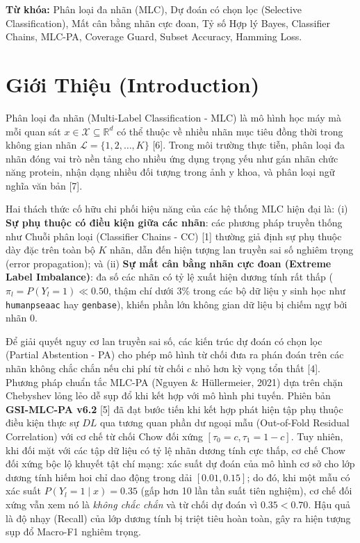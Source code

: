 \documentclass[10pt,a4paper,twoside]{article}
\begin{document}
\vspace{0.5em}
\noindent\textbf{Từ khóa:} Phân loại đa nhãn (MLC), Dự đoán có chọn lọc (Selective Classification), Mất cân bằng nhãn cực đoan, Tỷ số Hợp lý Bayes, Classifier Chains, MLC-PA, Coverage Guard, Subset Accuracy, Hamming Loss.

\section{Giới Thiệu (Introduction)}
Phân loại đa nhãn (Multi-Label Classification - MLC) là mô hình học máy mà mỗi quan sát $x \in \mathcal{X} \subseteq \mathbb{R}^d$ có thể thuộc về nhiều nhãn mục tiêu đồng thời trong không gian nhãn $\mathcal{L} = \{1, 2, \dots, K\}$ [6]. Trong môi trường thực tiễn, phân loại đa nhãn đóng vai trò nền tảng cho nhiều ứng dụng trọng yếu như gán nhãn chức năng protein, nhận dạng nhiều đối tượng trong ảnh y khoa, và phân loại ngữ nghĩa văn bản [7].

Hai thách thức cố hữu chi phối hiệu năng của các hệ thống MLC hiện đại là: (i) \textbf{Sự phụ thuộc có điều kiện giữa các nhãn}: các phương pháp truyền thống như Chuỗi phân loại (Classifier Chains - CC) [1] thường giả định sự phụ thuộc dày đặc trên toàn bộ $K$ nhãn, dẫn đến hiện tượng lan truyền sai số nghiêm trọng (error propagation); và (ii) \textbf{Sự mất cân bằng nhãn cực đoan (Extreme Label Imbalance)}: đa số các nhãn có tỷ lệ xuất hiện dương tính rất thấp ($\pi_l = P(Y_l = 1) \ll 0.50$, thậm chí dưới $3\%$ trong các bộ dữ liệu y sinh học như \texttt{humanpseaac} hay \texttt{genbase}), khiến phần lớn không gian dữ liệu bị chiếm ngự bởi nhãn $0$.

Để giải quyết nguy cơ lan truyền sai số, các kiến trúc dự đoán có chọn lọc (Partial Abstention - PA) cho phép mô hình từ chối đưa ra phán đoán trên các nhãn không chắc chắn nếu chi phí từ chối $c$ nhỏ hơn kỳ vọng tổn thất [4]. Phương pháp chuẩn tắc MLC-PA (Nguyen \& H{\"u}llermeier, 2021) dựa trên chặn Chebyshev lỏng lẻo dễ sụp đổ khi kết hợp với mô hình phi tuyến. Phiên bản \textbf{GSI-MLC-PA v6.2} [5] đã đạt bước tiến khi kết hợp phát hiện tập phụ thuộc điều kiện thực sự $DL$ qua tương quan phần dư ngoại mẫu (Out-of-Fold Residual Correlation) với cơ chế từ chối Chow đối xứng $[\tau_0 = c, \tau_1 = 1-c]$. Tuy nhiên, khi đối mặt với các tập dữ liệu có tỷ lệ nhãn dương tính cực thấp, cơ chế Chow đối xứng bộc lộ khuyết tật chí mạng: xác suất dự đoán của mô hình cơ sở cho lớp dương tính hiếm hoi chỉ dao động trong dải $[0.01, 0.15]$; do đó, khi một mẫu có xác suất $P(Y_l = 1 \mid x) = 0.35$ (gấp hơn 10 lần tần suất tiên nghiệm), cơ chế đối xứng vẫn xem nó là \textit{không chắc chắn} và từ chối dự đoán vì $0.35 < 0.70$. Hậu quả là độ nhạy (Recall) của lớp dương tính bị triệt tiêu hoàn toàn, gây ra hiện tượng sụp đổ Macro-F1 nghiêm trọng.
\end{document}
